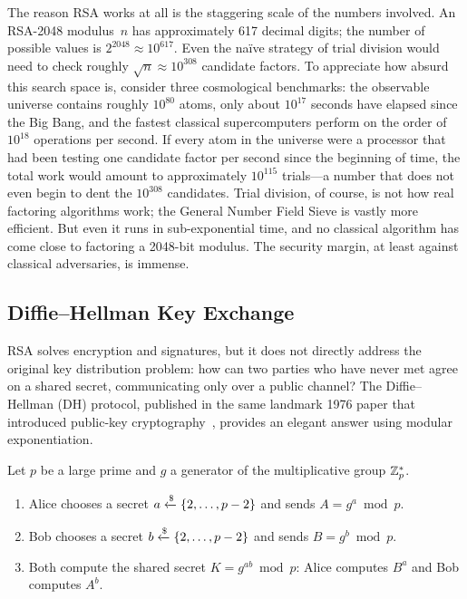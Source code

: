 The reason RSA works at all is the staggering scale of the numbers involved.  An RSA-2048 modulus~$n$ has approximately 617 decimal digits; the number of possible values is $2^{2048} \approx 10^{617}$.  Even the na\"ive strategy of trial division would need to check roughly $\sqrt{n} \approx 10^{308}$ candidate factors.  To appreciate how absurd this search space is, consider three cosmological benchmarks: the observable universe contains roughly $10^{80}$ atoms, only about $10^{17}$ seconds have elapsed since the Big Bang, and the fastest classical supercomputers perform on the order of $10^{18}$ operations per second.  If every atom in the universe were a processor that had been testing one candidate factor per second since the beginning of time, the total work would amount to approximately $10^{115}$ trials---a number that does not even begin to dent the $10^{308}$ candidates.  Trial division, of course, is not how real factoring algorithms work; the General Number Field Sieve is vastly more efficient.  But even it runs in sub-exponential time, and no classical algorithm has come close to factoring a 2048-bit modulus.  The security margin, at least against classical adversaries, is immense.

\subsection{Diffie--Hellman Key Exchange}
\label{subsec:dh}

RSA solves encryption and signatures, but it does not directly address the original key distribution problem: how can two parties who have never met agree on a shared secret, communicating only over a public channel?  The Diffie--Hellman (DH) protocol, published in the same landmark 1976 paper that introduced public-key cryptography~\cite{DiffieHellman1976}, provides an elegant answer using modular exponentiation.

\begin{definition}
\label{def:dh}
Let $p$ be a large prime and $g$ a generator of the multiplicative group $\mathbb{Z}_p^*$.
\begin{enumerate}
\item Alice chooses a secret $a \getsr \{2, \ldots, p-2\}$ and sends $A = g^a \bmod p$.
\item Bob chooses a secret $b \getsr \{2, \ldots, p-2\}$ and sends $B = g^b \bmod p$.
\item Both compute the shared secret $K = g^{ab} \bmod p$: Alice computes $B^a$ and Bob computes $A^b$.
\end{enumerate}
\end{definition}

